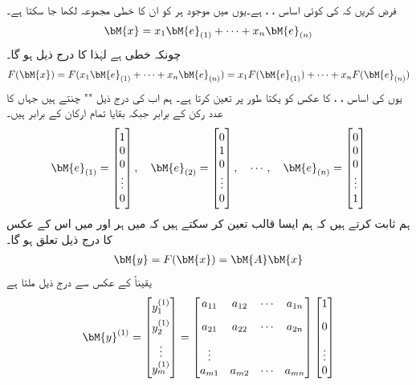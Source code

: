 فرض کریں کہ  کی کوئی اساس ، ،  ہے۔یوں  میں موجود ہر  کو ان کا خطی مجموعہ لکھا جا سکتا ہے۔
\begin{align*}
\bM{x}=x_1\bM{e}_{(1)}+\cdots+x_n\bM{e}_{(n)}
\end{align*}
چونکہ  خطی ہے لہٰذا  کا   درج ذیل ہو گا۔
\begin{align*}
F(\bM{x})=F(x_1\bM{e}_{(1)}+\cdots+x_n\bM{e}_{(n)})=x_1F(\bM{e}_{(1)})+\cdots+x_nF(\bM{e}_{(n)})
\end{align*}
یوں  کی اساس ، ،  کا عکس   کو یکتا طور پر تعین کرتا ہے۔ ہم اب  کی درج ذیل "" چنتے ہیں جہاں  کا  عدد رکن   کے برابر جبکہ بقایا تمام ارکان  کے برابر ہیں۔
\begin{align}
\bM{e}_{(1)}=\begin{bmatrix} 1\\ 0\\ 0\\ \vdots\\0 \end{bmatrix}, \quad \bM{e}_{(2)}=\begin{bmatrix} 0\\ 1\\ 0\\ \vdots\\0 \end{bmatrix}, \quad \cdots, \quad \bM{e}_{(n)}=\begin{bmatrix} 0\\ 0\\ 0\\ \vdots\\1 \end{bmatrix}
\end{align}
ہم ثابت کرتے ہیں کہ ہم ایسا  قالب  تعین کر سکتے ہیں کہ  میں ہر   اور  میں اس کے عکس  کا درج ذیل تعلق ہو گا۔
\begin{align}
\bM{y}=F(\bM{x})=\bM{A}\bM{x}
\end{align}
یقیناً  کے عکس  سے درج ذیل ملتا ہے
\begin{align*}
\bM{y}^{(1)}=\begin{bmatrix} y_1^{(1)}\\[1ex]y_2^{(1)}\\[1ex]  \vdots \\ y_m^{(1)} \end{bmatrix}=\begin{bmatrix} a_{11}&a_{12}&\cdots&a_{1n}\\[2ex]
a_{21}&a_{22}&\cdots&a_{2n}\\[2ex]  \vdots\\a_{m1}&a_{m2}&\cdots &a_{mn} \end{bmatrix} \begin{bmatrix}1\\[2ex]0\\[2ex]  \vdots\\ 0  \end{bmatrix}
\end{align*}

